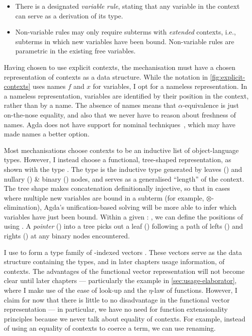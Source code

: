 \begin{itemize}
  \item There is a designated \emph{variable rule}, stating that any variable
    in the context can serve as a derivation of its type.
  \item Non-variable rules may only require subterms with \emph{extended}
    contexts, i.e., subterms in which new variables have been bound.
    Non-variable rules are parametric in the existing free variables.
\end{itemize}

Having chosen to use explicit contexts, the mechanisation must have a chosen
representation of contexts as a data structure.
While the notation in \cref{fig:explicit-contexts} uses names $f$ and $x$
for variables, I opt for a nameless representation.
In a nameless representation, variables are identified by their position in
the context, rather than by a name.
The absence of names means that $\alpha$-equivalence is just on-the-nose
equality, and also that we never have to reason about freshness of names.
Agda does not have support for nominal techniques~\citep{GP02}, which may have
made names a better option.

Most mechanisations choose contexts to be an inductive list of object-language
types.
However, I instead choose a functional, tree-shaped representation, as shown
with the type .
The type  is the inductive type generated by
leaves (\AgdaInductiveConstructor{[-]}) and
nullary (\AgdaInductiveConstructor{$\upvarepsilon$}) \&
binary (\AgdaInductiveConstructor{\_<+>\_}) nodes, and serves as a generalised
``length'' of the context.
The tree shape makes concatenation definitionally
injective, so that in cases where multiple new variables are bound in a subterm
(for example, $\otimes$-elimination), Agda's unification-based solving will
be more able to infer which variables have just been bound.
Within a given \AgdaSpace{}\AgdaSymbol:\AgdaSpace{}%
, we can define the positions of  using
.
A \emph{pointer} () into a tree picks out a leaf
(\AgdaInductiveConstructor{[-]}) following a path of lefts
(\AgdaInductiveConstructor{$\swarrow$}) and rights
(\AgdaInductiveConstructor{$\searrow$}) at any binary nodes encountered.


I use  to form a type family of -indexed
vectors .
These vectors serve as the data structure containing the types, and in later
chapters usage information, of contexts.
The advantages of the functional vector representation will not become clear
until later chapters --- particularly the example in
\cref{sec:usage-elaborator}, where I make use of the ease of look-up and the
$\eta$-law of functions.
However, I claim for now that there is little to no disadvantage in the
functional vector representation --- in particular, we have no need for
function extensionality principles because we never talk about equality of
contexts.
For example, instead of using an equality of contexts to coerce a term, we can
use renaming.

